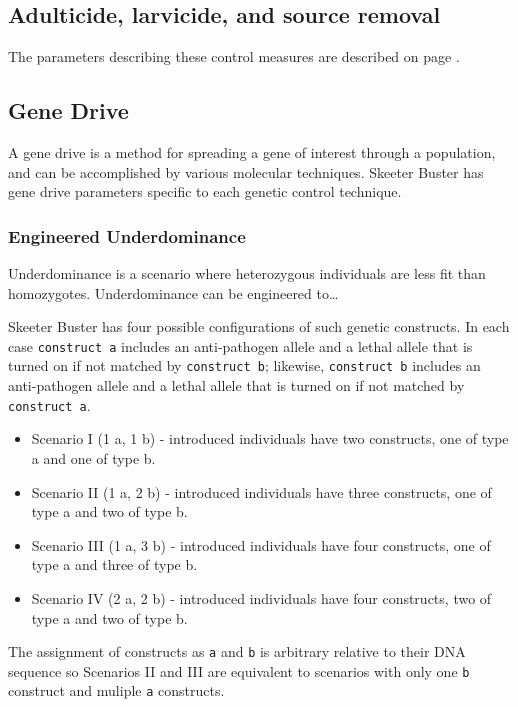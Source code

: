 \documentclass[11pt]{article}
\newcommand{\linecmd}[1]{\texttt{#1}}
\begin{document}
\subsection{Adulticide, larvicide, and source removal}

The parameters describing these control measures are described on page \pageref{Traditionalcontrol}.

\subsection{Gene Drive}

A gene drive is a method for spreading a gene of interest through a population, and can be accomplished by various molecular techniques. Skeeter Buster has gene drive parameters specific to each genetic control technique.

\subsubsection{Engineered Underdominance}%

Underdominance is a scenario where heterozygous individuals are less fit than homozygotes. Underdominance can be engineered to\dots

Skeeter Buster has four possible configurations of such genetic constructs. In each case \linecmd{construct a} includes an anti-pathogen allele and a lethal allele that is turned on if not matched by \linecmd{construct b}; likewise, \linecmd{construct b} includes an anti-pathogen allele and a lethal allele that is turned on if not matched by \linecmd{construct a}.
\begin{itemize}
	\item Scenario I (1 a, 1 b) - introduced individuals have two constructs, one of type a and one of type b.
	\item Scenario II (1 a, 2 b) - introduced individuals have three constructs, one of type a and two of type b. 
	\item Scenario III (1 a, 3 b) - introduced individuals have four constructs, one of type a and three of type b. 
	\item Scenario IV (2 a, 2 b) - introduced individuals have four constructs, two of type a and two of type b. 
\end{itemize}

The assignment of constructs as \linecmd{a} and \linecmd{b} is arbitrary relative to their DNA sequence so Scenarios II and III are equivalent to scenarios with only one \linecmd{b} construct and muliple \linecmd{a} constructs.%
\end{document}
